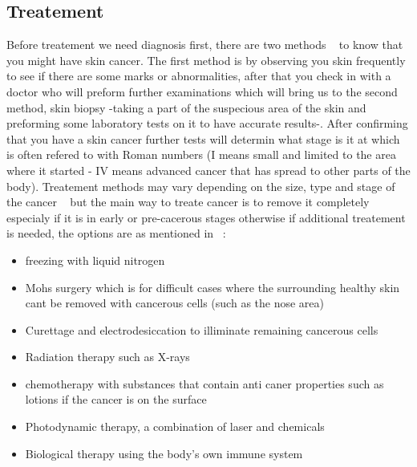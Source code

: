     \subsection{Treatement}
        Before treatement we need diagnosis first, there are two methods ~\cite{clinic2020} to  know that you might have skin cancer. The first method is by observing you skin frequently to see if there are some marks or abnormalities, after that you check in with a doctor who will preform further examinations which will bring us to the second method, skin biopsy -taking a part of the suspecious area of the skin and preforming some laboratory tests on it to have accurate results-.
        After confirming that you have a skin cancer further tests will determin what stage is it at which is often refered to with Roman numbers (I means small and limited to the area where it started - IV means advanced cancer that has spread to other parts of the body).
        Treatement methods may vary depending on the size, type and stage of the cancer ~\cite{nhs2020} but the main way to treate cancer is to remove it completely especialy if it is in early or pre-cacerous stages otherwise if additional treatement is needed, the options are as mentioned in ~\cite{clinic2020}:
            \begin{itemize}
                \item freezing with liquid nitrogen
                \item Mohs surgery which is for difficult cases where the surrounding healthy skin cant be removed with cancerous cells (such as the nose area)
                \item Curettage and electrodesiccation to illiminate remaining cancerous cells  
                \item Radiation therapy such as X-rays
                \item chemotherapy with substances that contain anti caner properties such as lotions if the cancer is on the surface
                \item Photodynamic therapy, a combination of laser and chemicals 
                \item Biological therapy using the body's own immune system
            \end{itemize}

